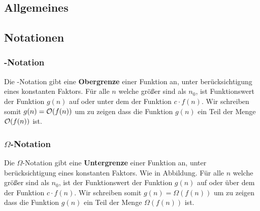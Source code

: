 \documentclass[10pt,a4paper]{article}
\begin{document}
\begin{multicols*}{4}
\section{Allgemeines}
\subsection{Notationen}
\begin{center}
\end{center}

\subsubsection*{\OO-Notation}
Die \OO-Notation gibt eine \textbf{Obergrenze} einer Funktion an, unter berücksichtigung eines konstanten Faktors. Für
alle \(n\) welche größer sind als \(n_{0}\), ist Funktionswert der Funktion \(g(n)\) auf oder unter dem der Funktion
\(c \cdot f(n)\). Wir schreiben somit \(g(n) = \mathcal{O}(f(n))\) um zu zeigen dass die Funktion \(g(n)\) ein Teil der Menge
\(\mathcal{O}(f(n))\) ist.

\subsubsection*{\(\Omega\)-Notation}
Die \(\Omega\)-Notation gibt eine \textbf{Untergrenze} einer Funktion an, unter berücksichtigung eines konstanten
Faktors. Wie in Abbildung. Für alle \(n\) welche größer sind als \(n_{0}\), ist der Funktionswert der Funktion \(g(n)\)
auf oder über dem der Funktion \(c \cdot f(n)\). Wir schreiben somit \(g(n) = \Omega(f(n))\) um zu zeigen dass die
Funktion \(g(n)\) ein Teil der Menge \(\Omega(f(n))\) ist.


\end{multicols*}
\end{document}
